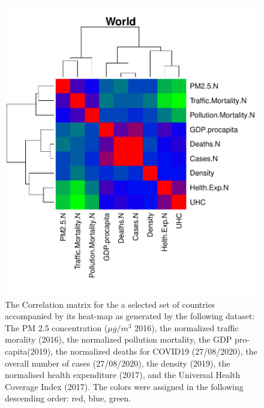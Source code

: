 \documentclass[
12pt, %
a4paper, %
oneside, %
headinclude,footinclude, %
BCOR5mm, %
]{scrartcl}
\begin{document}
\begin{figure}[h]
\begin{center}
\includegraphics[scale=1]{Pic/CorrMatrix_WORLD.pdf}
\caption{The Correlation matrix for the a selected set of countries accompanied by its heat-map as generated by the following dataset: The PM 2.5 concentration ($\mu g/m^{3}$ 2016), the normalized traffic morality (2016), the normalized pollution mortality, the GDP pro-capita(2019), the normalized deaths for COVID19 (27/08/2020), the overall number of cases (27/08/2020), the density (2019), the normalised health expenditure (2017), and the Universal Health Coverage Index (2017). The colors were assigned in the following descending order: red, blue, green.}
\label{World_CorrMatrix}
\end{center}
\end{figure}
\end{document}
